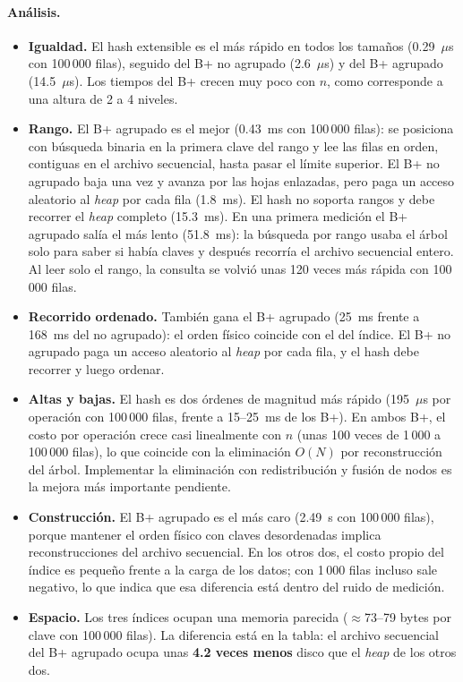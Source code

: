 \documentclass[11pt,a4paper]{article}
\begin{document}
\paragraph{Análisis.}
\begin{itemize}
  \item \textbf{Igualdad.} El hash extensible es el más rápido en todos los tamaños (0.29~$\mu$s con 100\,000 filas), seguido del B+ no agrupado (2.6~$\mu$s) y del B+ agrupado (14.5~$\mu$s). Los tiempos del B+ crecen muy poco con $n$, como corresponde a una altura de 2 a 4 niveles.
  \item \textbf{Rango.} El B+ agrupado es el mejor (0.43~ms con 100\,000 filas): se posiciona con búsqueda binaria en la primera clave del rango y lee las filas en orden, contiguas en el archivo secuencial, hasta pasar el límite superior. El B+ no agrupado baja una vez y avanza por las hojas enlazadas, pero paga un acceso aleatorio al \emph{heap} por cada fila (1.8~ms). El hash no soporta rangos y debe recorrer el \emph{heap} completo (15.3~ms). En una primera medición el B+ agrupado salía el más lento (51.8~ms): la búsqueda por rango usaba el árbol solo para saber si había claves y después recorría el archivo secuencial entero. Al leer solo el rango, la consulta se volvió unas 120 veces más rápida con 100\,000 filas.
  \item \textbf{Recorrido ordenado.} También gana el B+ agrupado (25~ms frente a 168~ms del no agrupado): el orden físico coincide con el del índice. El B+ no agrupado paga un acceso aleatorio al \emph{heap} por cada fila, y el hash debe recorrer y luego ordenar.
  \item \textbf{Altas y bajas.} El hash es dos órdenes de magnitud más rápido (195~$\mu$s por operación con 100\,000 filas, frente a 15--25~ms de los B+). En ambos B+, el costo por operación crece casi linealmente con $n$ (unas 100 veces de 1\,000 a 100\,000 filas), lo que coincide con la eliminación $O(N)$ por reconstrucción del árbol. Implementar la eliminación con redistribución y fusión de nodos es la mejora más importante pendiente.
  \item \textbf{Construcción.} El B+ agrupado es el más caro (2.49~s con 100\,000 filas), porque mantener el orden físico con claves desordenadas implica reconstrucciones del archivo secuencial. En los otros dos, el costo propio del índice es pequeño frente a la carga de los datos; con 1\,000 filas incluso sale negativo, lo que indica que esa diferencia está dentro del ruido de medición.
  \item \textbf{Espacio.} Los tres índices ocupan una memoria parecida ($\approx$73--79 bytes por clave con 100\,000 filas). La diferencia está en la tabla: el archivo secuencial del B+ agrupado ocupa unas \textbf{4.2 veces menos} disco que el \emph{heap} de los otros dos.
\end{itemize}
\end{document}
